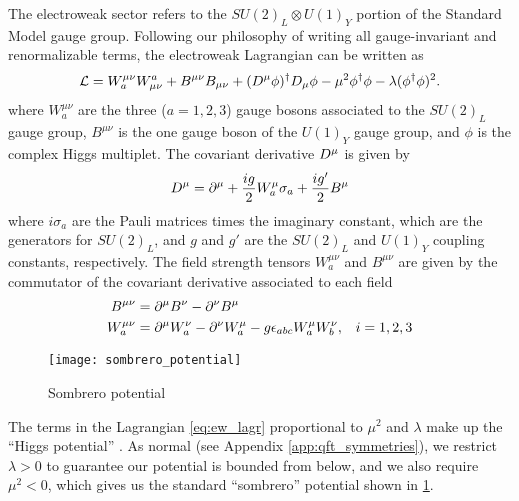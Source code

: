 The electroweak sector refers to the $SU(2)_L \otimes U(1)_Y$ portion of the Standard Model gauge group.
Following our philosophy of writing all gauge-invariant and renormalizable terms, the electroweak Lagrangian can be written as
\begin{equation}\label{eq:ew_lagr}
\mathcal{L} =  W^{\mu\nu}_a W_{\mu\nu}^a + B^{\mu\nu} B_{\mu\nu} + (D^\mu \phi)^\dagger D_\mu \phi -  \mu^2 \phi^\dagger \phi - \lambda (\phi^\dagger \phi)^2.
\end{equation}
where $W^{\mu\nu}_a$ are the three ($a=1,2,3$) gauge bosons associated to the $SU(2)_L$ gauge group, $B^{\mu\nu}$ is the one gauge boson of the $U(1)_Y$ gauge group, and $\phi$ is the complex Higgs multiplet.
The covariant derivative $D^\mu$ is given by
\begin{equation}
D^\mu = \partial^\mu  + \frac{ig}{2} W^\mu_a \sigma_a + \frac{i g'}{2} B^\mu
\end{equation}
where $i \sigma_a$ are the Pauli matrices times the imaginary constant, which are the generators for $SU(2)_L$, and $g$ and $g'$ are the $SU(2)_L$ and $U(1)_Y$ coupling constants, respectively.
The field strength tensors  $W^{\mu\nu}_a$ and $B^{\mu\nu}$ are given by the commutator of the covariant derivative associated to each field
\begin{align} \label{eq:ew_field_strength_tensor}
B^{\mu\nu}   &=  \partial^\mu B^\nu - \partial^\nu B^\mu & \\
W^{\mu\nu}_a &=  \partial^\mu W^\nu_a - \partial^\nu W^\mu_a - g \epsilon_{abc} W^\mu_a W^\nu_b,& i = 1,2,3 \notag
\end{align}
\begin{figure}
\caption{Sombrero potential}
\label{fig:sombrero}
\texttt{[image: sombrero\_potential]}
\end{figure}

The terms in the Lagrangian \ref{eq:ew_lagr} proportional to $\mu^2$ and $\lambda$ make up the ``Higgs potential'' \cite{Higgs:1964pj}.
As normal (see Appendix \ref{app:qft_symmetries}), we restrict $\lambda > 0$ to guarantee our potential is bounded from below, and we also require $\mu^2 < 0$, which gives us the standard ``sombrero'' potential shown in \ref{fig:sombrero}.

